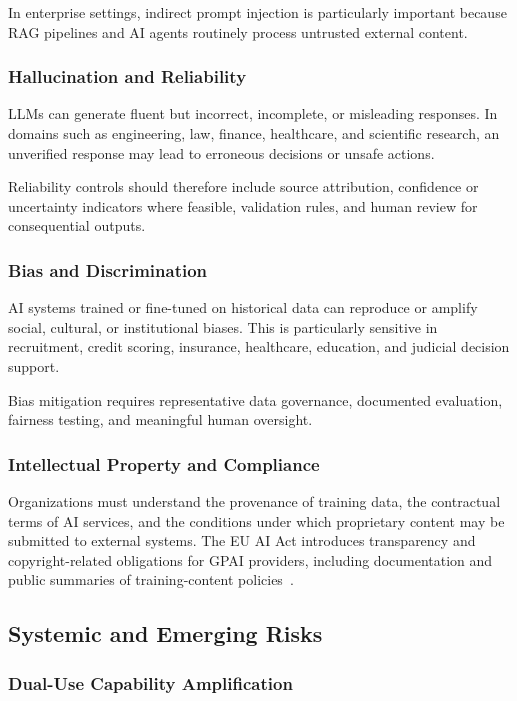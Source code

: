 \documentclass[conference]{IEEEtran}
\begin{document}
In enterprise settings, indirect prompt injection is particularly important because RAG pipelines and AI agents routinely process untrusted external content.

\subsubsection{Hallucination and Reliability}

LLMs can generate fluent but incorrect, incomplete, or misleading responses. In domains such as engineering, law, finance, healthcare, and scientific research, an unverified response may lead to erroneous decisions or unsafe actions.

Reliability controls should therefore include source attribution, confidence or uncertainty indicators where feasible, validation rules, and human review for consequential outputs.

\subsubsection{Bias and Discrimination}

AI systems trained or fine-tuned on historical data can reproduce or amplify social, cultural, or institutional biases. This is particularly sensitive in recruitment, credit scoring, insurance, healthcare, education, and judicial decision support.

Bias mitigation requires representative data governance, documented evaluation, fairness testing, and meaningful human oversight.

\subsubsection{Intellectual Property and Compliance}

Organizations must understand the provenance of training data, the contractual terms of AI services, and the conditions under which proprietary content may be submitted to external systems. The EU AI Act introduces transparency and copyright-related obligations for GPAI providers, including documentation and public summaries of training-content policies~\cite{eu_ai_act}.

\subsection{Systemic and Emerging Risks}

\subsubsection{Dual-Use Capability Amplification}
\end{document}
